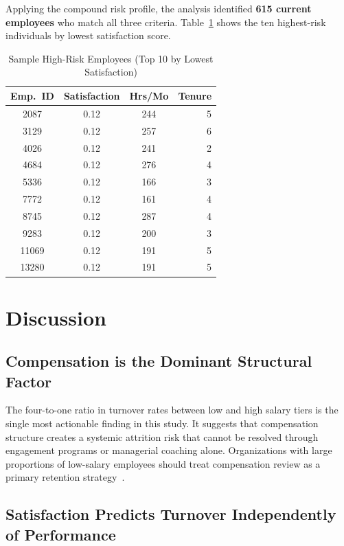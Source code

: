 \documentclass[conference]{IEEEtran}
\begin{document}
Applying the compound risk profile, the analysis identified \textbf{615
current employees} who match all three criteria. Table~\ref{tab:risk} shows
the ten highest-risk individuals by lowest satisfaction score.

\begin{table}[h]
\caption{Sample High-Risk Employees (Top 10 by Lowest Satisfaction)}
\label{tab:risk}
\centering
\begin{tabular}{cccr}
\toprule
\textbf{Emp.\ ID} & \textbf{Satisfaction} & \textbf{Hrs/Mo} & \textbf{Tenure} \\
\midrule
2087  & 0.12 & 244 & 5 \\
3129  & 0.12 & 257 & 6 \\
4026  & 0.12 & 241 & 2 \\
4684  & 0.12 & 276 & 4 \\
5336  & 0.12 & 166 & 3 \\
7772  & 0.12 & 161 & 4 \\
8745  & 0.12 & 287 & 4 \\
9283  & 0.12 & 200 & 3 \\
11069 & 0.12 & 191 & 5 \\
13280 & 0.12 & 191 & 5 \\
\bottomrule
\end{tabular}
\end{table}

\section{Discussion}
\label{sec:discussion}

\subsection{Compensation is the Dominant Structural Factor}

The four-to-one ratio in turnover rates between low and high salary tiers is
the single most actionable finding in this study. It suggests that
compensation structure creates a systemic attrition risk that cannot be
resolved through engagement programs or managerial coaching alone.
Organizations with large proportions of low-salary employees should treat
compensation review as a primary retention strategy~\cite{griffeth2000}.

\subsection{Satisfaction Predicts Turnover Independently of Performance}
\end{document}
